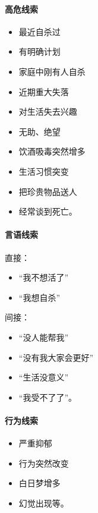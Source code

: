 \documentclass[
  a4paper,
]{ctexart}
\providecommand{\tightlist}{%
  \setlength{\itemsep}{0pt}\setlength{\parskip}{0pt}}
\begin{document}
\paragraph{高危线索}\label{ux9ad8ux5371ux7ebfux7d22}

\begin{itemize}
\tightlist
\item
  最近自杀过
\item
  有明确计划
\item
  家庭中刚有人自杀
\item
  近期重大失落
\item
  对生活失去兴趣
\item
  无助、绝望
\item
  饮酒吸毒突然增多
\item
  生活习惯突变
\item
  把珍贵物品送人
\item
  经常谈到死亡。
\end{itemize}

\paragraph{言语线索}\label{ux8a00ux8bedux7ebfux7d22}

直接：

\begin{itemize}
\tightlist
\item
  ``我不想活了''
\item
  ``我想自杀''
\end{itemize}

间接：

\begin{itemize}
\tightlist
\item
  ``没人能帮我''
\item
  ``没有我大家会更好''
\item
  ``生活没意义''
\item
  ``我受不了了''。
\end{itemize}

\paragraph{行为线索}\label{ux884cux4e3aux7ebfux7d22}

\begin{itemize}
\tightlist
\item
  严重抑郁
\item
  行为突然改变
\item
  白日梦增多
\item
  幻觉出现等。
\end{itemize}
\end{document}
